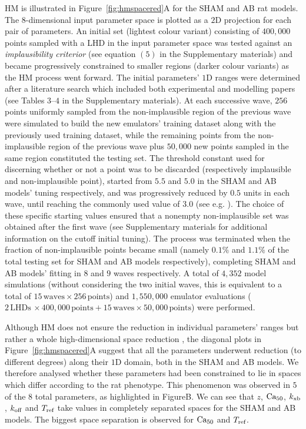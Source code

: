 \vspace{0.2cm}
HM is illustrated in Figure~\ref{fig:hmspacered}A for the SHAM and AB rat models. The $8$-dimensional input parameter space is plotted as a $2$D projection for each pair of parameters. An initial set (lightest colour variant) consisting of $400,000$ points sampled with a LHD in the input parameter space was tested against an \textit{implausibility criterior} (see equation $(5)$ in the Supplementary materials) and became progressively constrained to smaller regions (darker colour variants) as the HM process went forward. The initial parameters' $1$D ranges were determined after a literature search which included both experimental and modelling papers (see Tables $3$--$4$ in the Supplementary materials). At each successive wave, $256$ points uniformly sampled from the non-implausible region of the previous wave were simulated to build the new emulators' training dataset along with the previously used training dataset, while the remaining points from the non-implausible region of the previous wave plus $50,000$ new points sampled in the same region constituted the testing set. The threshold constant used for discerning whether or not a point was to be discarded (respectively implausible and non-implausible point), started from $5.5$ and $5.0$ in the SHAM and AB models' tuning respectively, and was progressively reduced by $0.5$ units in each wave, until reaching the commonly used value of $3.0$ (see e.g. \cite{Vernon:2010}). The choice of these specific starting values ensured that a nonempty non-implausible set was obtained after the first wave (see Supplementary materials for additional information on the cutoff initial tuning). The process was terminated when the fraction of non-implausible points became small (namely $0.1\%$ and $1.1\%$ of the total testing set for SHAM and AB models respectively), completing SHAM and AB models' fitting in $8$ and $9$ waves respectively. A total of $4,352$ model simulations (without considering the two initial waves, this is equivalent to a total of $15\,\text{waves}\times 256\,\text{points}$) and $1,550,000$ emulator evaluations ($2\,\text{LHDs}\,\times 400,000\,\text{points}+15\,\text{waves}\times 50,000\,\text{points}$) were performed.

\vspace{0.2cm}
Although HM does not ensure the reduction in individual parameters' ranges but rather a whole high-dimensional space reduction \cite{Coveney:2018}, the diagonal plots in Figure~\ref{fig:hmspacered}A suggest that all the parameters underwent reduction (to different degrees) along their $1$D domain, both in the SHAM and AB models. We therefore analysed whether these parameters had been constrained to lie in spaces which differ according to the rat phenotype. This phenomenon was observed in $5$ of the $8$ total parameters, as highlighted in FigureB. We can see that $z$, $\textrm{Ca}_{50}$, $k_{\textrm{xb}}$, $k_{\textrm{off}}$ and $T_{\textrm{ref}}$ take values in completely separated spaces for the SHAM and AB models. The biggest space separation is observed for $\textrm{Ca}_{50}$ and $T_{\textrm{ref}}$.

